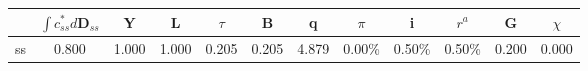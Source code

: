 \begin{tabular}{lccccccccccc}
\toprule
 & $\int c^{*}_{ss} d\mathbf{D}_{ss}$ & Y & L & $\tau$ & B & q & $\pi$ & i & $r^{a}$ & G & $\chi$ \\
\midrule
ss & 0.800 & 1.000 & 1.000 & 0.205 & 0.205 & 4.879 & 0.00\% & 0.50\% & 0.50\% & 0.200 & 0.000 \\
\bottomrule
\end{tabular}
